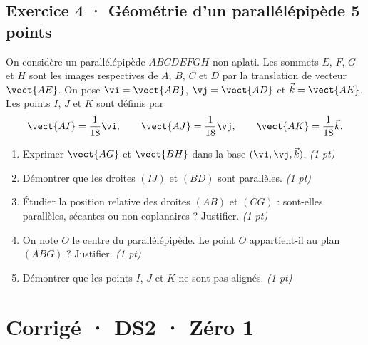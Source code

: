 \subsection*{Exercice 4 · Géométrie d'un parallélépipède \hfill 5 points}On considère un parallélépipède $ABCDEFGH$ non aplati. Les sommets $E$, $F$, $G$ et $H$ sont les images respectives de $A$, $B$, $C$ et $D$ par la translation de vecteur $\vect{AE}$.
On pose $\vi=\vect{AB}$, $\vj=\vect{AD}$ et $\vec k=\vect{AE}$.
Les points $I$, $J$ et $K$ sont définis par
\[\vect{AI}=\frac1{18}\vi,\qquad\vect{AJ}=\frac1{18}\vj,\qquad\vect{AK}=\frac1{18}\vec k.\]

\begin{enumerate}

\item Exprimer $\vect{AG}$ et $\vect{BH}$ dans la base $(\vi,\vj,\vec k)$. \hfill\textit{(1 pt)}

\item Démontrer que les droites $(IJ)$ et $(BD)$ sont parallèles. \hfill\textit{(1 pt)}

\item Étudier la position relative des droites $(AB)$ et $(CG)$ : sont-elles parallèles, sécantes ou non coplanaires ? Justifier. \hfill\textit{(1 pt)}

\item On note $O$ le centre du parallélépipède. Le point $O$ appartient-il au plan $(ABG)$ ? Justifier. \hfill\textit{(1 pt)}

\item Démontrer que les points $I$, $J$ et $K$ ne sont pas alignés. \hfill\textit{(1 pt)}

\end{enumerate}

\ifprof\clearpage

\section*{Corrigé · DS2 · Zéro 1}\label{cor:2-1}

